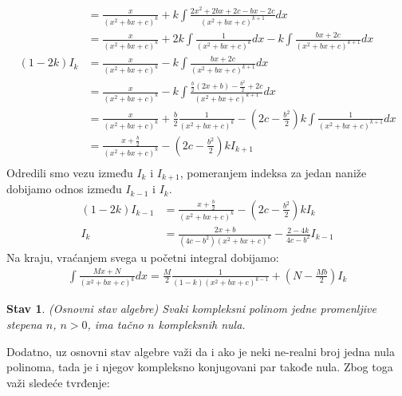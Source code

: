 \documentclass{article}
\newtheorem{stav}{Stav}[section]
\begin{document}
\begin{lemabox}
\begin{align*}
                  & =\frac{x}{(x^2+bx+c)^k}+k\int\frac{2x^2+2bx+2c-bx-2c}{(x^2+bx+c)^{k+1}} dx                                       \\
                  & =\frac{x}{(x^2+bx+c)^k}+2k\int\frac{1}{(x^2+bx+c)^k}dx-k\int\frac{bx+2c}{(x^2+bx+c)^{k+1}} dx                    \\
        (1-2k)I_k & =\frac{x}{(x^2+bx+c)^k}-k\int\frac{bx+2c}{(x^2+bx+c)^{k+1}} dx                                                   \\
                  & =\frac{x}{(x^2+bx+c)^k}-k\int\frac{\frac{b}{2}(2x+b)-\frac{b^2}{2}+2c}{(x^2+bx+c)^{k+1}} dx                      \\
                  & =\frac{x}{(x^2+bx+c)^k}+\frac{b}{2}\frac{1}{(x^2+bx+c)^{k}}-(2c-\frac{b^2}{2})k\int\frac{1}{(x^2+bx+c)^{k+1}} dx \\
                  & =\frac{x+\frac{b}{2}}{(x^2+bx+c)^k}-(2c-\frac{b^2}{2})kI_{k+1}                                                   \\
    \end{align*}
    Odredili smo vezu između $I_k$ i $I_{k+1}$, pomeranjem indeksa za jedan
    naniže dobijamo odnos između $I_{k-1}$ i $I_k$.
    \begin{align*}
        (1-2k)I_{k-1} & =\frac{x+\frac{b}{2}}{(x^2+bx+c)^k}-(2c-\frac{b^2}{2})kI_k    \\
        I_k           & =\frac{2x+b}{(4c-b^2)(x^2+bx+c)^k}-\frac{2-4k}{4c-b^2}I_{k-1}
    \end{align*}
    Na kraju, vraćanjem svega u početni integral dobijamo:
    \begin{align*}
        \int \frac{Mx+N}{(x^2+bx+c)^k}dx=\frac{M}{2}\frac{1}{(1-k)(x^2+bx+c)^{k-1}}+(N-\frac{Mb}{2})I_k
    \end{align*}
\end{lemabox}

\begin{stavbox}
    \begin{stav}\label{OSA}
        (Osnovni stav algebre) Svaki kompleksni polinom
        jedne promenljive stepena $n$, $n>0$, ima tačno
        $n$ kompleksnih nula.
    \end{stav}
\end{stavbox}

Dodatno, uz osnovni stav algebre važi da i ako je neki ne-realni
broj jedna nula polinoma, tada je i njegov kompleksno konjugovani
par takođe nula. Zbog toga važi sledeće tvrđenje:
\end{document}
